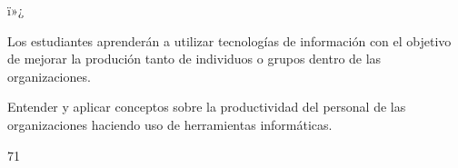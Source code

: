 ï»¿\begin{syllabus}


\begin{justification}
Los estudiantes aprenderán a utilizar tecnologías de información con el objetivo de mejorar
la produción tanto de individuos o grupos dentro de las organizaciones.
\end{justification}

\begin{goals}
\item Entender y aplicar conceptos  sobre la productividad del personal de las organizaciones haciendo uso de herramientas informáticas.
\end{goals}

\begin{outcomes}
\end{outcomes}

\begin{unit}{\LUONEDef}{\LUONEBib}{7}{1}
   \begin{topics}
   	\item \ITONETopicONExONExONE
      \begin{subtopics}
      	\item \ITONETopicONExONExONExTWO
      	\item \ITONETopicONExONExONExTHREE
      \end{subtopics}	
      \item \ITONETopicONExONExTHREE
      \item \ITONETopicONExONExFOUR
      \item \ITTWOTopicONExTWOxONE
      \begin{subtopics}
	      \item \ITTWOTopicONExTWOxONExFOUR
      \end{subtopics}	
      \item \ITTWOTopicONExTWOxTHREE
      \item \ITFOURTopicONExFOURxONE
      \item \ITFOURTopicONExFOURxTWO
      \item \ITSIXTopicONExSIXxONE
      \item \ITSIXTopicONExSIXxTHREE
      \item \ITSIXTopicONExSIXxNINE
      \item \OMCTWOTopicTWOxTWOxONEONE
      \item \OMCTWOTopicTWOxTWOxONESIX
      \item \OMCTHREETopicTWOxTHREExTHREE
      \item \TDSONETopicTHREExONExTWO
      \item \TDSONETopicTHREExONExFOUR
      \item \TDSONETopicTHREExONExFIVE
   \end{topics}
	\LUONEGoal
\end{unit}


\end{syllabus}

